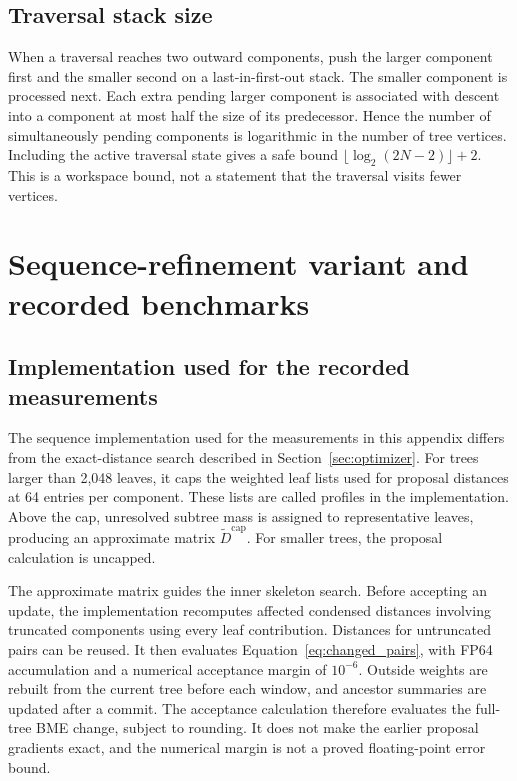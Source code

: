 \subsection{Traversal stack size}

When a traversal reaches two outward components, push the larger component first and the smaller second on a last-in-first-out stack.
The smaller component is processed next.
Each extra pending larger component is associated with descent into a component at most half the size of its predecessor.
Hence the number of simultaneously pending components is logarithmic in the number of tree vertices.
Including the active traversal state gives a safe bound
$\lfloor\log_2(2N-2)\rfloor+2$.
This is a workspace bound, not a statement that the traversal visits fewer vertices.

\section{Sequence-refinement variant and recorded benchmarks}
\label{sec:sequence_variant}

\subsection{Implementation used for the recorded measurements}

The sequence implementation used for the measurements in this appendix differs from the exact-distance search described in Section~\ref{sec:optimizer}.
For trees larger than 2,048 leaves, it caps the weighted leaf lists used for proposal distances at 64 entries per component.
These lists are called profiles in the implementation.
Above the cap, unresolved subtree mass is assigned to representative leaves, producing an approximate matrix $\widetilde D^{\mathrm{cap}}$.
For smaller trees, the proposal calculation is uncapped.

The approximate matrix guides the inner skeleton search.
Before accepting an update, the implementation recomputes affected condensed distances involving truncated components using every leaf contribution.
Distances for untruncated pairs can be reused.
It then evaluates Equation~\eqref{eq:changed_pairs}, with FP64 accumulation and a numerical acceptance margin of $10^{-6}$.
Outside weights are rebuilt from the current tree before each window, and ancestor summaries are updated after a commit.
The acceptance calculation therefore evaluates the full-tree BME change, subject to rounding.
It does not make the earlier proposal gradients exact, and the numerical margin is not a proved floating-point error bound.

